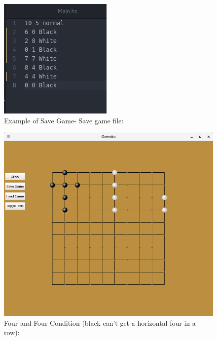 \documentclass[11]{article}
\begin{document}
\begin{figure}[h]
					\caption{Example of Save Game- Save game file:}				\centering
					\includegraphics[scale=0.5]{save2.png}
\end{figure}

\begin{figure}[h]
					\caption{Four and Four Condition (black can't get a horizontal four in a row):}				\centering
					\includegraphics[scale=0.5]{FourAndFour.png}
\end{figure}

\newpage

		


		
	
\end{document}
